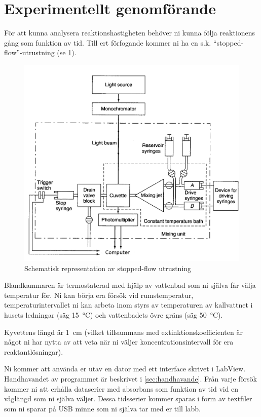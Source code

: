 \section{Experimentellt genomförande}
\label{sec:exper}
För att kunna analysera reaktionshastigheten behöver ni kunna följa
reaktionens gång som funktion av tid. Till ert förfogande kommer ni ha en
s.k. ``stopped-flow''-utrustning (se \cref{fig:stopped-flow}).

\begin{figure}[h,center]
  \centering
  \includegraphics[scale=0.2]{fig/stopped_flow.png}
  \caption{Schematisk representation av stopped-flow utrustning}
  \label{fig:stopped-flow}
\end{figure}

Blandkammaren är termostaterad med hjälp av vattenbad som ni själva får
välja temperatur för. Ni kan börja era försök vid
rumstemperatur, temperaturintervallet ni kan arbeta inom styrs av
temperaturen av kallvattnet i husets ledningar (säg \SI{15}{\celsius})
och vattenbadets övre gräns (säg \SI{50}{\celsius}). 

Kyvettens längd är \SI{1}{\centi\metre} (vilket
tillsammans med extinktionskoefficienten  är något ni har nytta av att
veta när ni väljer koncentrationsintervall för era reaktantlösningar).

Ni kommer att använda er utav en dator med ett interface
skrivet i LabView. Handhavandet av programmet är beskrivet i
\cref{sec:handhavande}. Från varje försök kommer ni att erhålla dataserier med
absorbans som funktion av tid vid en våglängd som ni själva väljer. Dessa
tidsserier kommer sparas i form av textfiler som ni sparar på USB minne
som ni själva tar med er till labb.

